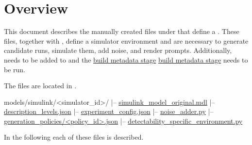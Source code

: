 \documentclass[11pt]{article}
\begin{document}
\newcommand{\environmentBuildMetadataStageLink}{%
  \ifdefined\tracebenchDocsCombinedManualMode
    \hyperref[sec:simulink-build-metadata-stage]{build metadata stage}%
  \else
    \href{simulink_generated_metadata_schema.pdf}{build metadata stage}%
  \fi
}

\label{docstart:environment_profiles}

\section*{Overview}

This document describes the manually created files under  that define a \name{} \termSimulator.
These files, together with  , define a simulator environment and are necessary to generate candidate runs, simulate them, add noise, and render prompts. 
\label{sec:allowed-tracebench-models}
Additionally, \termSimulator needs to be added to \hyperref[sec:allowed-tracebench-models]{} and the \environmentBuildMetadataStageLink{} needs to be run.


The files are located in .
\newcommand{\environmentTreeSimulinkModelOriginal}{\hyperref[sec:environment-simulink-model-original]{simulink\_model\_original.mdl}}
\newcommand{\environmentTreeDescriptionLevels}{\hyperref[sec:environment-description-levels]{description\_levels.json}}
\newcommand{\environmentTreeExperimentConfig}{\hyperref[sec:environment-experiment-config]{experiment\_config.json}}
\newcommand{\environmentTreeNoiseAdder}{\hyperref[sec:environment-noise-adder]{noise\_adder.py}}
\newcommand{\environmentTreeGenerationPolicy}{\hyperref[sec:generation-policy-schema]{generation\_policies/\textless policy\_id\textgreater.json}}
\newcommand{\environmentTreeDetectabilitySpecific}{\hyperref[sec:environment-detectability-specific]{detectability\_specific\_environment.py}}
\begin{LinkedDocCode}
models/simulink/<simulator_id>/
|-- \environmentTreeSimulinkModelOriginal
|-- \environmentTreeDescriptionLevels
|-- \environmentTreeExperimentConfig
|-- \environmentTreeNoiseAdder
|-- \environmentTreeGenerationPolicy
|-- \environmentTreeDetectabilitySpecific\quad
\end{LinkedDocCode}

In the following each of these files is described.
\label{sec:generation-policy-schema}
\end{document}
